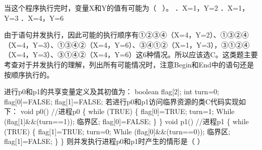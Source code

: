 当这个程序执行完时，变量X和Y的值有可能为（ ~）。 ．X=1，Y=2 ．X=1，Y=3
．X=4，Y=6
\par{}
\begin{solution}由于语句并发执行，因此可能的执行顺序有①②③④（X=4，Y=2）、①③②④（X=4，Y=3）、①③④②（X=4，Y=6）、③④①②（X=1，Y=3），③①②④（X=4，Y=3）、③①④②（X=4，Y=6）这6种情况。所以应该选C。这类题主要考查对于并发执行的理解，列出所有可能情况时，注意Begin和End中的语句还是按顺序执行的。
\end{solution}
\question 进行p0和p1的共享变量定义及其初值为： boolean flag{[}2{]}; int turn=0;
flag{[}0{]}=FALSE; flag{[}1{]}=FALSE;
若进行p0和p1访问临界资源的类C代码实现如下： void p0() //进程p0 \{ while
(TRUE) \{ flag{[}0{]}=TRUE; turn=1; While (flag{[}1{]}\&\&(turn==1));
临界区; flag{[}0{]}=FALSE; \} \} void p1() //进程p1 \{ while (TRUE) \{
flag{[}1{]}=TRUE; turn=0; While (flag{[}0{]}\&\&(turn==0)); 临界区;
flag{[}1{]}=FALSE; \} \} 则并发执行进程p0和p1时产生的情形是（ ）
\par{}
